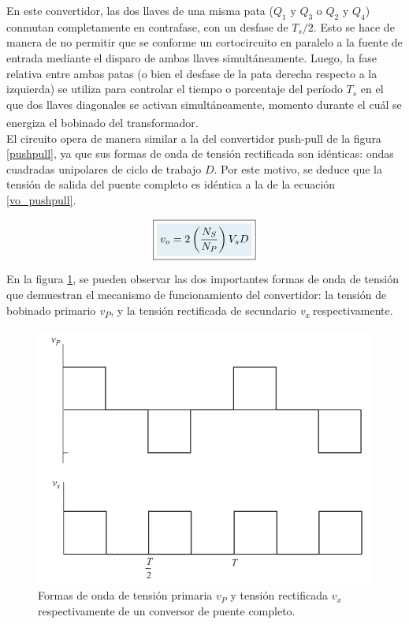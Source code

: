 En este convertidor, las dos llaves de una misma pata ($Q_1$ y $Q_3$ o $Q_2$ y $Q_4$) conmutan completamente en contrafase, con un desfase de $T_s/2$. Esto se hace de manera de no permitir que se conforme un cortocircuito en paralelo a la fuente de entrada mediante el disparo de ambas llaves simultáneamente. Luego, la fase relativa entre ambas patas (o bien el desfase de la pata derecha respecto a la izquierda) se utiliza para controlar el tiempo o porcentaje del período $T_s$ en el que dos llaves diagonales se activan simultáneamente, momento durante el cuál se energiza el bobinado del transformador.\textsuperscript{\cite{PaperFullBridge}}\\

El circuito opera de manera similar a la del convertidor push-pull de la figura \ref{pushpull}, ya que sus formas de onda de tensión rectificada son idénticas: ondas cuadradas unipolares de ciclo de trabajo $D$. Por este motivo, se deduce que la tensión de salida del puente completo es idéntica a la de la ecuación \ref{vo_pushpull}.

\begin{equation}\label{vo_fullbridge}
    \boxed{
        \highlight{v_o = 2\left(\frac{N_{S}}{N_{P}}\right)V_sD}
    }
\end{equation}

En la figura \ref{fullbridge-waveforms}, se pueden observar las dos importantes formas de onda de tensión que demuestran el mecanismo de funcionamiento del convertidor: la {\Medium tensión de bobinado primario \textit{v\textsubscript{P}}}, y la {\Medium tensión rectificada de secundario \textit{v\textsubscript{x}}} respectivamente.\\

\begin{figure}[h]
    \centering
    \includegraphics[scale=0.48]{Imagenes/Formas de onda Full-Bridge.png}
    \caption{Formas de onda de tensión primaria $v_P$ y tensión rectificada $v_x$ respectivamente de un conversor de puente completo.}
    \label{fullbridge-waveforms}
\end{figure}

